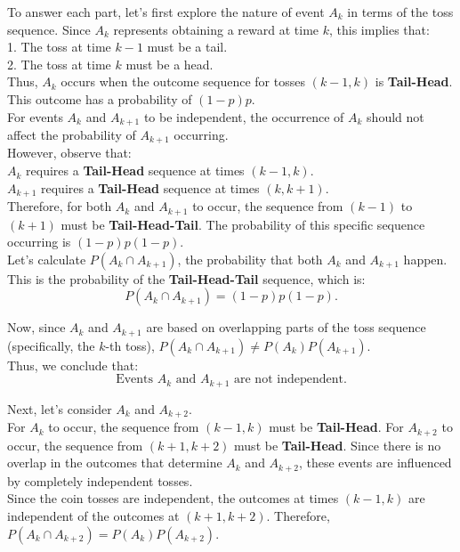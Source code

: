 \begin{solution}
    To answer each part, let’s first explore the nature of event \( A_k \) in terms of the toss sequence. Since \( A_k \) represents obtaining a reward at time \( k \), this implies that:\\

    1. The toss at time \( k-1 \) must be a tail.\\
    2. The toss at time \( k \) must be a head.\\
    
    Thus, \( A_k \) occurs when the outcome sequence for tosses \( (k-1, k) \) is \textbf{Tail-Head}. This outcome has a probability of \( (1-p)p \).\\
    
    For events \( A_k \) and \( A_{k+1} \) to be independent, the occurrence of \( A_k \) should not affect the probability of \( A_{k+1} \) occurring.\\
    
    However, observe that:\\
    
    \( A_k \) requires a \textbf{Tail-Head} sequence at times \( (k-1, k) \).\\
    \( A_{k+1} \) requires a \textbf{Tail-Head} sequence at times \( (k, k+1) \).\\
    
    Therefore, for both \( A_k \) and \( A_{k+1} \) to occur, the sequence from \( (k-1) \) to \( (k+1) \) must be \textbf{Tail-Head-Tail}. The probability of this specific sequence occurring is \((1-p)p(1-p)\).\\
    
    Let’s calculate \( P(A_k \cap A_{k+1}) \), the probability that both \( A_k \) and \( A_{k+1} \) happen. This is the probability of the \textbf{Tail-Head-Tail} sequence, which is:
    \[
    P(A_k \cap A_{k+1}) = (1 - p)p(1 - p).
    \]
    
    Now, since \( A_k \) and \( A_{k+1} \) are based on overlapping parts of the toss sequence (specifically, the \( k \)-th toss), \( P(A_k \cap A_{k+1}) \neq P(A_k)P(A_{k+1}) \).\\
    
    Thus, we conclude that:
    \[
    \text{Events } A_k \text{ and } A_{k+1} \text{ are not independent.}
    \]
    
    
    Next, let’s consider \( A_k \) and \( A_{k+2} \).\\
    
    For \( A_k \) to occur, the sequence from \( (k-1, k) \) must be \textbf{Tail-Head}. For \( A_{k+2} \) to occur, the sequence from \( (k+1, k+2) \) must be \textbf{Tail-Head}. Since there is no overlap in the outcomes that determine \( A_k \) and \( A_{k+2} \), these events are influenced by completely independent tosses.\\
    
    Since the coin tosses are independent, the outcomes at times \( (k-1, k) \) are independent of the outcomes at \( (k+1, k+2) \). Therefore, \( P(A_k \cap A_{k+2}) = P(A_k)P(A_{k+2}) \).\\
\end{solution}

